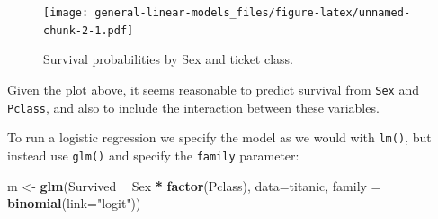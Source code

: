 \documentclass[]{article}
\newenvironment{Shaded}{\begin{snugshade}}{\end{snugshade}}
\newcommand{\KeywordTok}[1]{\textcolor[rgb]{0.13,0.29,0.53}{\textbf{#1}}}
\newcommand{\DataTypeTok}[1]{\textcolor[rgb]{0.13,0.29,0.53}{#1}}
\newcommand{\StringTok}[1]{\textcolor[rgb]{0.31,0.60,0.02}{#1}}
\newcommand{\OperatorTok}[1]{\textcolor[rgb]{0.81,0.36,0.00}{\textbf{#1}}}
\newcommand{\NormalTok}[1]{#1}
\let\oldparagraph\paragraph
\renewcommand{\paragraph}[1]{\oldparagraph{#1}\mbox{}}
\theoremstyle{definition}
\theoremstyle{definition}
\theoremstyle{definition}
\theoremstyle{remark}
\begin{document}
\begin{Shaded}
\end{Shaded}

\begin{figure}
\centering
\texttt{[image: general-linear-models\_files/figure-latex/unnamed-chunk-2-1.pdf]}
\caption{\label{fig:unnamed-chunk-2}Survival probabilities by Sex and ticket
class.}
\end{figure}

Given the plot above, it seems reasonable to predict survival from
\texttt{Sex} and \texttt{Pclass}, and also to include the interaction
between these variables.

To run a logistic regression we specify the model as we would with
\texttt{lm()}, but instead use \texttt{glm()} and specify the
\texttt{family} parameter:

\begin{Shaded}
\begin{Highlighting}[]
\NormalTok{m <-}\StringTok{ }\KeywordTok{glm}\NormalTok{(Survived }\OperatorTok{~}\StringTok{ }\NormalTok{Sex }\OperatorTok{*}\StringTok{ }\KeywordTok{factor}\NormalTok{(Pclass), }
         \DataTypeTok{data=}\NormalTok{titanic, }\DataTypeTok{family =} \KeywordTok{binomial}\NormalTok{(}\DataTypeTok{link=}\StringTok{"logit"}\NormalTok{))}
\end{Highlighting}
\end{Shaded}

\hypertarget{helper-function-logistic}{\paragraph{}\label{helper-function-logistic}}
\end{document}
